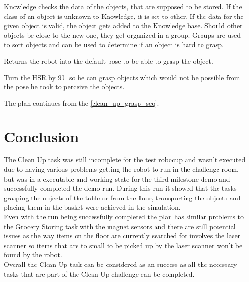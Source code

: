 \documentclass[main.tex]{subfiles}
\begin{document}
    
    Knowledge checks the data of the objects, that are supposed to be stored. If the class of an object is unknown to Knowledge, it is set to other. If the data for the given object is valid, the object gets added to the Knowledge base. Should other objects be close to the new one, they get organized in a group. Groups are used to sort objects and can be used to determine if an object is hard to grasp.
    
   	Returns the robot into the default pose to be able to grasp the object.

    Turn the HSR by $90^\circ$ so he can grasp objects which would not be possible from the pose he took to perceive the objects.

    The plan continues from the \ref{clean_up_grasp_seq}.
    
    
	\section{Conclusion}
	The Clean Up task was still incomplete for the test robocup and wasn't executed due to having various problems getting the robot to run in the challenge room, but was in a executable and working state for the third milestone demo and successfully completed the demo run. During this run it showed that the tasks grasping the objects of the table or from the floor, transporting the objects and placing them in the basket were achieved in the simulation.\\
	Even with the run being successfully completed the plan has similar problems to the Grocery Storing task with the magnet sensors and there are still potential issues as the way items on the floor are currently searched for involves the laser scanner so items that are to small to be picked up by the laser scanner won't be found by the robot.\\
	Overall the Clean Up task can be considered as an success as all the necessary tasks that are part of the Clean Up challenge can be completed. 
	
	\endgroup
\end{document}
